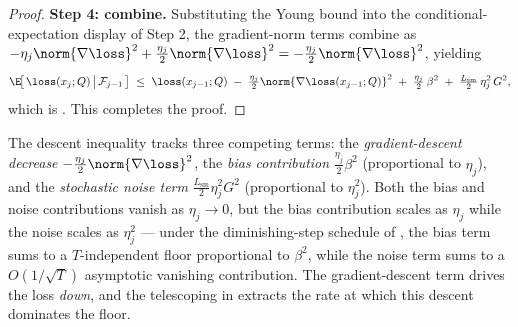 \begin{proof}
\noindent\textbf{Step 4: combine.}
Substituting the Young bound into the conditional-expectation display
of Step 2, the gradient-norm terms combine as
$-\eta_j \norm{\nabla \loss}^2 + \tfrac{\eta_j}{2} \norm{\nabla \loss}^2
= -\tfrac{\eta_j}{2} \norm{\nabla \loss}^2$, yielding
\begin{align*}
   \E\!\bigl[\, \loss(x_j; Q) \,\big|\, \mathcal F_{j-1} \,\bigr]
   \;\le\;
   \loss(x_{j-1}; Q)
   \;-\; \tfrac{\eta_j}{2} \norm{\nabla \loss(x_{j-1}; Q)}^2
   \;+\; \tfrac{\eta_j}{2}\, \beta^2
   \;+\; \tfrac{L_{\mathrm{sm}}}{2}\, \eta_j^2\, G^2,
\end{align*}
which is . This completes the proof.
\end{proof}

\begin{remark}\label{rem:descent_inequality_constants}
The descent inequality  tracks three
competing terms: the \emph{gradient-descent decrease}
$-\tfrac{\eta_j}{2} \norm{\nabla \loss}^2$, the \emph{bias contribution}
$\tfrac{\eta_j}{2} \beta^2$ (proportional to $\eta_j$), and the
\emph{stochastic noise term} $\tfrac{L_{\mathrm{sm}}}{2} \eta_j^2 G^2$
(proportional to $\eta_j^2$). Both the bias and noise contributions
vanish as $\eta_j \to 0$, but the bias contribution scales as $\eta_j$
while the noise scales as $\eta_j^2$ — under the diminishing-step
schedule of , the bias term sums to a
$T$-independent floor proportional to $\beta^2$, while the noise term
sums to a $O(1/\sqrt T)$ asymptotic vanishing contribution. The
gradient-descent term drives the loss \emph{down}, and the telescoping
in  extracts the rate at which this descent
dominates the floor.
\end{remark}

